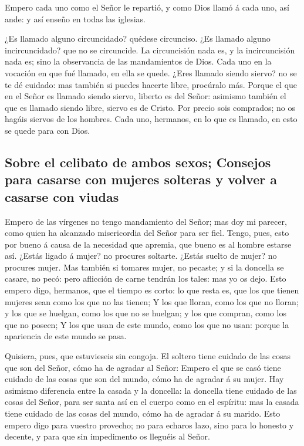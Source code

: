  Empero cada uno como el Señor le repartió, y como Dios
llamó á cada uno, así ande: y así enseño en todas las iglesias.

 ¿Es llamado alguno circuncidado? quédese circunciso. ¿Es
llamado alguno incircuncidado? que no se circuncide.  La
circuncisión nada es, y la incircuncisión nada es; sino la observancia
de las mandamientos de Dios.  Cada uno en la vocación en
que fué llamado, en ella se quede.  ¿Eres llamado siendo
siervo? no se te dé cuidado: mas también si puedes hacerte libre,
procúralo más.  Porque el que en el Señor es llamado
siendo siervo, liberto es del Señor: asimismo también el que es llamado
siendo libre, siervo es de Cristo.  Por precio sois
comprados; no os hagáis siervos de los hombres.  Cada
uno, hermanos, en lo que es llamado, en esto se quede para con Dios.

\hypertarget{sobre-el-celibato-de-ambos-sexos-consejos-para-casarse-con-mujeres-solteras-y-volver-a-casarse-con-viudas}{%
\subsection{Sobre el celibato de ambos sexos; Consejos para casarse con
mujeres solteras y volver a casarse con
viudas}\label{sobre-el-celibato-de-ambos-sexos-consejos-para-casarse-con-mujeres-solteras-y-volver-a-casarse-con-viudas}}

 Empero de las vírgenes no tengo mandamiento del Señor;
mas doy mi parecer, como quien ha alcanzado misericordia del Señor para
ser fiel.  Tengo, pues, esto por bueno á causa de la
necesidad que apremia, que bueno es al hombre estarse así.
 ¿Estás ligado á mujer? no procures soltarte. ¿Estás
suelto de mujer? no procures mujer.  Mas también si
tomares mujer, no pecaste; y si la doncella se casare, no pecó: pero
aflicción de carne tendrán los tales: mas yo os dejo. 
Esto empero digo, hermanos, que el tiempo es corto: lo que resta es, que
los que tienen mujeres sean como los que no las tienen; 
Y los que lloran, como los que no lloran; y los que se huelgan, como los
que no se huelgan; y los que compran, como los que no poseen;
 Y los que usan de este mundo, como los que no usan:
porque la apariencia de este mundo se pasa.

 Quisiera, pues, que estuvieseis sin congoja. El soltero
tiene cuidado de las cosas que son del Señor, cómo ha de agradar al
Señor:  Empero el que se casó tiene cuidado de las cosas
que son del mundo, cómo ha de agradar á su mujer.  Hay
asimismo diferencia entre la casada y la doncella: la doncella tiene
cuidado de las cosas del Señor, para ser santa así en el cuerpo como en
el espíritu: mas la casada tiene cuidado de las cosas del mundo, cómo ha
de agradar á su marido.  Esto empero digo para vuestro
provecho; no para echaros lazo, sino para lo honesto y decente, y para
que sin impedimento os lleguéis al Señor.

